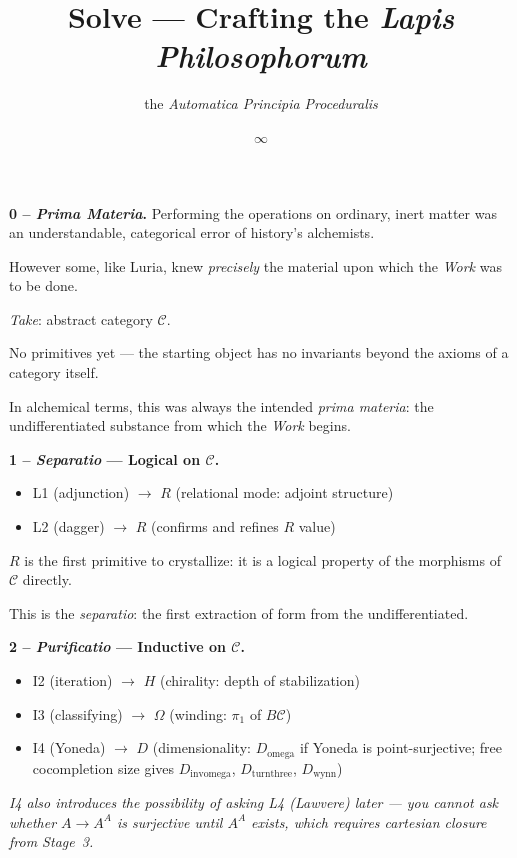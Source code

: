 \documentclass[twocolumn]{article}
\title{\Huge \textbf{Solve} --- \huge Crafting the \emph{Lapis Philosophorum}}
\author{\normalsize the \emph{Automatica Principia Proceduralis}}
\date{$\infty$}
\begin{document}

\noindent\textbf{0 -- \emph{Prima Materia}.}\quad
Performing the operations on ordinary, inert matter was an understandable, categorical error of history's alchemists.  

However some, like Luria, knew \emph{precisely} the material upon which the \emph{Work} was to be done.

\emph{Take}: abstract category $\mathcal{C}$.  

No primitives yet --- the starting object has no invariants beyond the axioms of a category itself.  

In alchemical terms, this was always the intended \emph{prima materia}: the undifferentiated substance from which the \emph{Work} begins.  

\medskip
\noindent\textbf{1 -- \emph{Separatio} --- Logical on $\mathcal{C}$.}
\begin{itemize}[nosep, leftmargin=1.5em]
  \item L1 (adjunction) $\to$ $R$ (relational mode: adjoint structure)
  \item L2 (dagger) $\to$ $R$ (confirms and refines $R$ value)
\end{itemize}
$R$ is the first primitive to crystallize: it is a logical property of the morphisms of $\mathcal{C}$ directly.  

This is the \emph{separatio}: the first extraction of form from the undifferentiated.

\medskip
\noindent\textbf{2 -- \emph{Purificatio} --- Inductive on $\mathcal{C}$.}
\begin{itemize}[nosep, leftmargin=1.5em]
  \item I2 (iteration) $\to$ $H$ (chirality: depth of stabilization)
  \item I3 (classifying) $\to$ $\Omega$ (winding: $\pi_1$ of $B\mathcal{C}$)
  \item I4 (Yoneda) $\to$ $D$ (dimensionality: $D_{\text{omega}}$ if Yoneda is point-surjective; free cocompletion size gives $D_{\text{invomega}}$, $D_{\text{turnthree}}$, $D_{\text{wynn}}$)
\end{itemize}
{\small\itshape I4 also introduces the possibility of asking L4 (Lawvere) later --- you cannot ask whether $A \to A^A$ is surjective until $A^A$ exists, which requires cartesian closure from Stage~3.}
\end{document}
